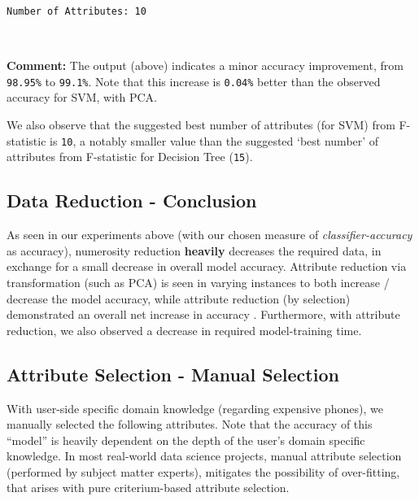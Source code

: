 \documentclass[11pt]{article}
\begin{document}
    \begin{Verbatim}[commandchars=\\\{\}]
Number of Attributes: 10
    \end{Verbatim}

    \begin{center}
    \end{center}
    { \hspace*{\fill} \\}
    
    \textbf{Comment:} The output (above) indicates a minor accuracy
improvement, from \texttt{98.95\%} to \texttt{99.1\%}. Note that this
increase is \texttt{0.04\%} better than the observed accuracy for SVM,
with PCA.

We also observe that the suggested best number of attributes (for SVM)
from F-statistic is \texttt{10}, a notably smaller value than the
suggested `best number' of attributes from F-statistic for Decision Tree
(\texttt{15}).

    \hypertarget{data-reduction---conclusion}{%
\subsection{Data Reduction -
Conclusion}\label{data-reduction---conclusion}}

As seen in our experiments above (with our chosen measure of
\emph{classifier-accuracy} as accuracy), numerosity reduction
\textbf{heavily} decreases the required data, in exchange for a small
decrease in overall model accuracy. Attribute reduction via
transformation (such as PCA) is seen in varying instances to both
increase / decrease the model accuracy, while attribute reduction (by
selection) demonstrated an overall net increase in accuracy .
Furthermore, with attribute reduction, we also observed a decrease in
required model-training time.

    \hypertarget{attribute-selection---manual-selection}{%
\subsection{Attribute Selection - Manual
Selection}\label{attribute-selection---manual-selection}}

With user-side specific domain knowledge (regarding expensive phones),
we manually selected the following attributes. Note that the accuracy of
this ``model'' is heavily dependent on the depth of the user's domain
specific knowledge. In most real-world data science projects, manual
attribute selection (performed by subject matter experts), mitigates the
possibility of over-fitting, that arises with pure criterium-based
attribute selection.
\end{document}
